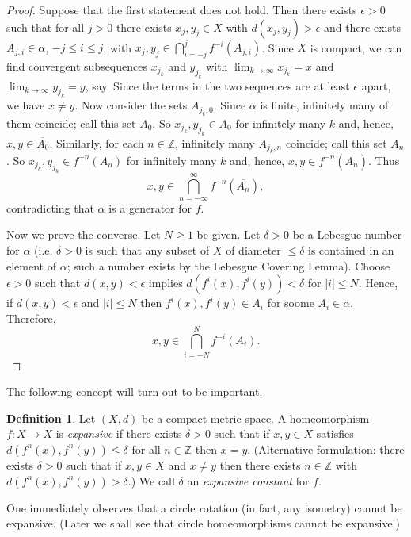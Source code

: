 \documentclass[12pt]{article}
\theoremstyle{definition}
\newtheorem{definition}[theorem]{Definition}
\theoremstyle{remark}
\begin{document}
\begin{proof}
Suppose that the first statement does not hold. Then there exists $\epsilon>0$ such that 
for all $j>0$ there exists $x_j,y_j \in X$ with $d(x_j,y_j)>\epsilon$ and there exists $A_{j,i} \in \alpha$,
$-j \le i \le j$, with $x_j,y_j \in \bigcap_{i=-j}^j f^{-i}(A_{j,i})$.
Since $X$ is compact, we can find convergent subsequences $x_{j_k}$ and $y_{j_k}$ with
$\lim_{k \to \infty} x_{j_k} = x$ and $\lim_{k \to \infty} y_{j_k} =y$, say. Since the terms in the two sequences are at least $\epsilon$ apart, we have $x \ne y$.
Now consider the sets $A_{j_k,0}$. Since $\alpha$ is finite, infinitely many of them coincide; call this set $A_0$. So $x_{j_k},y_{j_k} \in A_0$ for infinitely many $k$ and, hence,
$x,y \in \overline{A_0}$. Similarly, for each $n \in \mathbb Z$, infinitely many $A_{j_k,n}$ coincide; call this set $A_n$. 
So $x_{j_k},y_{j_k} \in f^{-n}(A_n)$ for infinitely many $k$ and, hence,
$x,y \in f^{-n}(\overline{A_n})$. Thus
\[
x,y \in \bigcap_{n = -\infty}^\infty f^{-n}(\overline{A_n}),
\]
contradicting that $\alpha$ is a generator for $f$.

Now we prove the converse. Let $N \ge 1$ be given. Let $\delta>0$ be a Lebesgue number for 
$\alpha$ (i.e. $\delta>0$ is such that any subset of $X$ of diameter $\le \delta$ is contained in an element of $\alpha$; such a number exists by the Lebesgue Covering Lemma). Choose 
$\epsilon>0$ such that
$d(x,y)<\epsilon$ implies $d(f^i(x),f^i(y))< \delta$ for $| i |\le N$.
Hence, if $d(x,y)<\epsilon$ and $|i| \le N$ then $f^{i}(x),f^i(y) \in A_i$ for soome $A_i \in \alpha$.
Therefore,
\[
x,y \in \bigcap_{i=-N}^N f^{-i}(A_i).
\]
\end{proof}

The following concept will turn out to be important.

\begin{definition}
Let $(X,d)$ be a compact metric space.
A homeomorphism $f : X \to X$ is {\it expansive} if there exists $\delta>0$ such that if $x,y \in X$
satisfies
$d(f^n(x),f^n(y)) \le \delta$ for all $n \in \mathbb Z$ then $x=y$.
(Alternative formulation: there exists $\delta>0$ such that if $x,y \in X$ and $x \ne y$ then there exists $n \in \mathbb Z$ with $d(f^n(x),f^n(y))>\delta$.) We call $\delta$ an {\it expansive constant} for $f$.
\end{definition}

One immediately observes that a circle rotation (in fact, any isometry)  cannot
be expansive. (Later we shall see that circle homeomorphisms cannot be expansive.)
\end{document}

